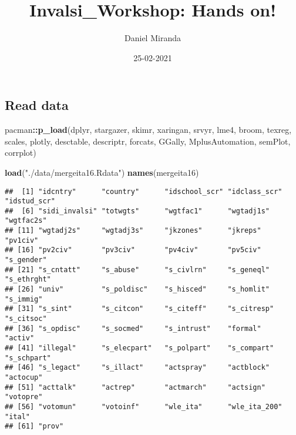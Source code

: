 \documentclass[
]{article}
\title{Invalsi\_Workshop: Hands on!}
\author{Daniel Miranda}
\date{25-02-2021}
\newenvironment{Shaded}{\begin{snugshade}}{\end{snugshade}}
\newcommand{\KeywordTok}[1]{\textcolor[rgb]{0.13,0.29,0.53}{\textbf{#1}}}
\newcommand{\NormalTok}[1]{#1}
\newcommand{\OperatorTok}[1]{\textcolor[rgb]{0.81,0.36,0.00}{\textbf{#1}}}
\newcommand{\StringTok}[1]{\textcolor[rgb]{0.31,0.60,0.02}{#1}}
\begin{document}
\maketitle

\hypertarget{read-data}{%
\subsection{Read data}\label{read-data}}

\begin{Shaded}
\begin{Highlighting}[]
\NormalTok{pacman}\OperatorTok{::}\KeywordTok{p_load}\NormalTok{(dplyr, stargazer, skimr, xaringan, srvyr, lme4, broom, texreg, scales, plotly, desctable, descriptr, forcats, GGally, MplusAutomation, semPlot, corrplot)}


\KeywordTok{load}\NormalTok{(}\StringTok{"./data/mergeita16.Rdata"}\NormalTok{)}
\KeywordTok{names}\NormalTok{(mergeita16)}
\end{Highlighting}
\end{Shaded}

\begin{verbatim}
##  [1] "idcntry"      "country"      "idschool_scr" "idclass_scr"  "idstud_scr"  
##  [6] "sidi_invalsi" "totwgts"      "wgtfac1"      "wgtadj1s"     "wgtfac2s"    
## [11] "wgtadj2s"     "wgtadj3s"     "jkzones"      "jkreps"       "pv1civ"      
## [16] "pv2civ"       "pv3civ"       "pv4civ"       "pv5civ"       "s_gender"    
## [21] "s_cntatt"     "s_abuse"      "s_civlrn"     "s_geneql"     "s_ethrght"   
## [26] "univ"         "s_poldisc"    "s_hisced"     "s_homlit"     "s_immig"     
## [31] "s_sint"       "s_citcon"     "s_citeff"     "s_citresp"    "s_citsoc"    
## [36] "s_opdisc"     "s_socmed"     "s_intrust"    "formal"       "activ"       
## [41] "illegal"      "s_elecpart"   "s_polpart"    "s_compart"    "s_schpart"   
## [46] "s_legact"     "s_illact"     "actspray"     "actblock"     "actocup"     
## [51] "acttalk"      "actrep"       "actmarch"     "actsign"      "votopre"     
## [56] "votomun"      "votoinf"      "wle_ita"      "wle_ita_200"  "ital"        
## [61] "prov"
\end{verbatim}

\begin{Shaded}
\end{Shaded}
\end{document}
